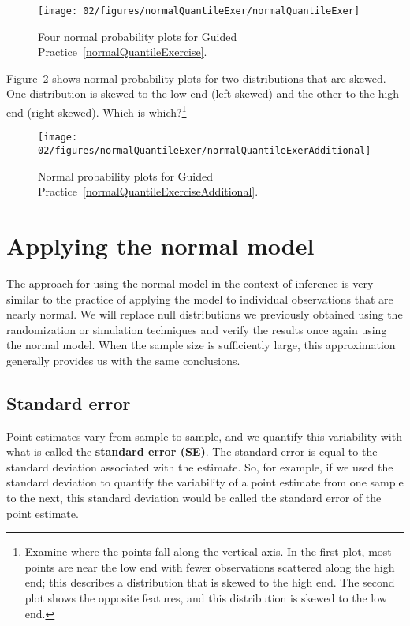 \begin{figure}
\centering
\texttt{[image: 02/figures/normalQuantileExer/normalQuantileExer]}
\caption{Four normal probability plots for Guided Practice~\ref{normalQuantileExercise}.}
\label{normalQuantileExer}
\end{figure}

\begin{exercise} \label{normalQuantileExerciseAdditional}
Figure~\ref{normalQuantileExerAdditional} shows normal probability plots for two distributions that are skewed. One distribution is skewed to the low end (left skewed) and the other to the high end (right skewed). Which is which?\footnote{Examine where the points fall along the vertical axis. In the first plot, most points are near the low end with fewer observations scattered along the high end; this describes a distribution that is skewed to the high end. The second plot shows the opposite features, and this distribution is skewed to the low end.}
\end{exercise}

\begin{figure}
\centering
\texttt{[image: 02/figures/normalQuantileExer/normalQuantileExerAdditional]}
\caption{Normal probability plots for Guided Practice~\ref{normalQuantileExerciseAdditional}.}
\label{normalQuantileExerAdditional}
\end{figure}


\section{Applying the normal model}
\label{ApplyingTheNormalModel}

The approach for using the normal model in the context of inference is very similar to the practice of applying the model to individual observations that are nearly normal. We will replace null distributions we previously obtained using the randomization or simulation techniques and verify the results once again using the normal model. When the sample size is sufficiently large, this approximation generally provides us with the same conclusions.

\subsection{Standard error}

Point estimates vary from sample to sample, and we quantify this variability with what is called the \textbf{standard error (SE)}. The standard error is equal to the standard deviation associated with the estimate. So, for example, if we used the standard deviation to quantify the variability of a point estimate from one sample to the next, this standard deviation would be called the standard error of the point estimate.


